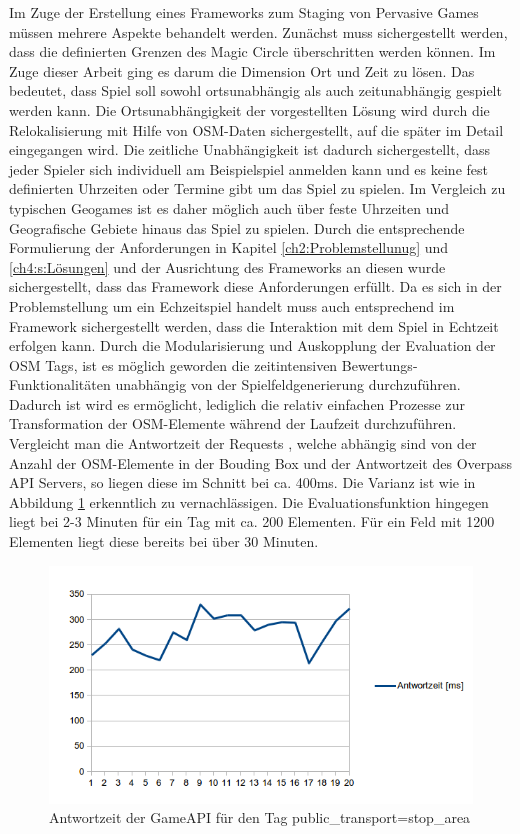 Im Zuge der Erstellung eines Frameworks zum Staging von Pervasive Games müssen mehrere Aspekte behandelt werden. Zunächst muss sichergestellt werden, dass die definierten Grenzen des Magic Circle überschritten werden können. Im Zuge dieser Arbeit ging es darum die Dimension Ort und Zeit zu lösen. Das bedeutet, dass Spiel soll sowohl ortsunabhängig als auch zeitunabhängig gespielt werden kann. Die Ortsunabhängigkeit der vorgestellten Lösung wird durch die Relokalisierung mit Hilfe von OSM-Daten sichergestellt, auf die später im Detail eingegangen wird. Die zeitliche Unabhängigkeit ist dadurch sichergestellt, dass jeder Spieler sich individuell am Beispielspiel anmelden kann und es keine fest definierten Uhrzeiten oder Termine gibt um das Spiel zu spielen. Im Vergleich zu typischen Geogames ist es daher möglich auch über feste Uhrzeiten und Geografische Gebiete hinaus das Spiel zu spielen. Durch die entsprechende Formulierung der Anforderungen in Kapitel \ref{ch2:Problemstellunug} und \ref{ch4:s:Lösungen} und der Ausrichtung des Frameworks an diesen wurde sichergestellt, dass das Framework diese Anforderungen erfüllt. Da es sich in der Problemstellung um ein Echzeitspiel handelt muss auch entsprechend im Framework sichergestellt werden, dass die Interaktion mit dem Spiel in Echtzeit erfolgen kann.
Durch die Modularisierung und Auskopplung der Evaluation der OSM Tags, ist es möglich geworden die zeitintensiven Bewertungs-Funktionalitäten unabhängig von der Spielfeldgenerierung durchzuführen. Dadurch ist wird es ermöglicht, lediglich die relativ einfachen Prozesse zur Transformation der OSM-Elemente während der Laufzeit durchzuführen. Vergleicht man die Antwortzeit der Requests , welche abhängig sind von der Anzahl der OSM-Elemente in der Bouding Box und der Antwortzeit des Overpass API Servers, so liegen diese im Schnitt bei ca. 400ms. Die Varianz ist wie in Abbildung \ref{img:ch6_img01_response_time} erkenntlich zu vernachlässigen. Die Evaluationsfunktion hingegen liegt bei 2-3 Minuten für ein Tag mit ca. 200 Elementen. Für ein Feld mit 1200 Elementen liegt diese bereits bei über 30 Minuten.

\begin{figure}[H]
\begin{center}
\includegraphics[width=150mm]{images/ch6_img01_response_time.png}
\caption{Antwortzeit der GameAPI für den Tag public\_transport=stop\_area}
\label{img:ch6_img01_response_time}
\end{center}
\end{figure}

